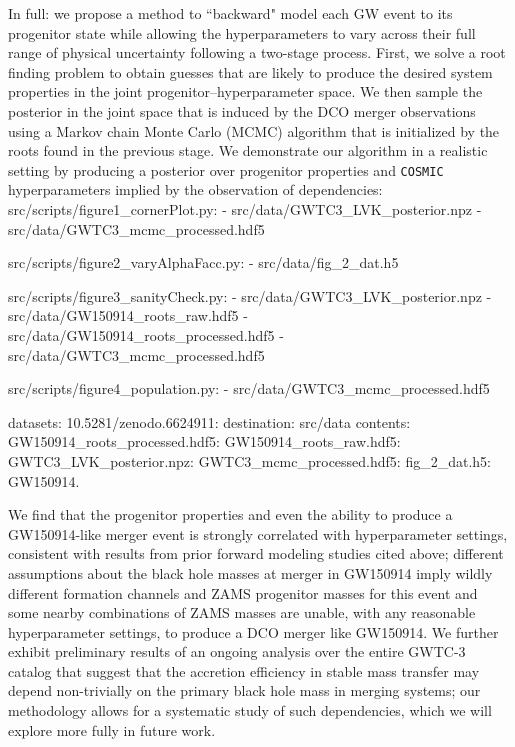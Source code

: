 \documentclass[linenumbers,twocolumn]{aastex631}
\begin{document}
In full: we propose a method to ``backward" model each GW event to its
progenitor state while allowing the hyperparameters to vary across their full
range of physical uncertainty following a two-stage process. First, we solve a
root finding problem to obtain guesses that are likely to produce the desired
system properties in the joint progenitor--hyperparameter space. We then sample
the posterior in the joint space that is induced by the DCO merger observations
using a Markov chain Monte Carlo (MCMC) algorithm that is initialized by the
roots found in the previous stage.  We demonstrate our algorithm in a realistic
setting by producing a posterior over progenitor properties and \texttt{COSMIC}
hyperparameters implied by the observation of
dependencies:
  src/scripts/figure1_cornerPlot.py:
    - src/data/GWTC3_LVK_posterior.npz
    - src/data/GWTC3_mcmc_processed.hdf5

  src/scripts/figure2_varyAlphaFacc.py:
    - src/data/fig_2_dat.h5

  src/scripts/figure3_sanityCheck.py:
    - src/data/GWTC3_LVK_posterior.npz
    - src/data/GW150914_roots_raw.hdf5
    - src/data/GW150914_roots_processed.hdf5
    - src/data/GWTC3_mcmc_processed.hdf5

  src/scripts/figure4_population.py:
    - src/data/GWTC3_mcmc_processed.hdf5

datasets:
  10.5281/zenodo.6624911:
    destination: src/data
    contents:
      GW150914_roots_processed.hdf5:
      GW150914_roots_raw.hdf5:
      GWTC3_LVK_posterior.npz:
      GWTC3_mcmc_processed.hdf5:
      fig_2_dat.h5:
 GW150914.  

We find that the progenitor properties and even the ability to produce a
GW150914-like merger event is strongly correlated with hyperparameter settings,
consistent with results from prior forward modeling studies cited above;
different assumptions about the black hole masses at merger in GW150914 imply
wildly different formation channels and ZAMS progenitor masses for this event
and some nearby combinations of ZAMS masses are unable, with any reasonable
hyperparameter settings, to produce a DCO merger like GW150914.  We further
exhibit preliminary results of an ongoing analysis over the entire GWTC-3
catalog \citep{GWTC-3} that suggest that the accretion efficiency in stable mass
transfer may depend non-trivially on the primary black hole mass in merging
systems; our methodology allows for a systematic study of such dependencies,
which we will explore more fully in future work.
\end{document}
